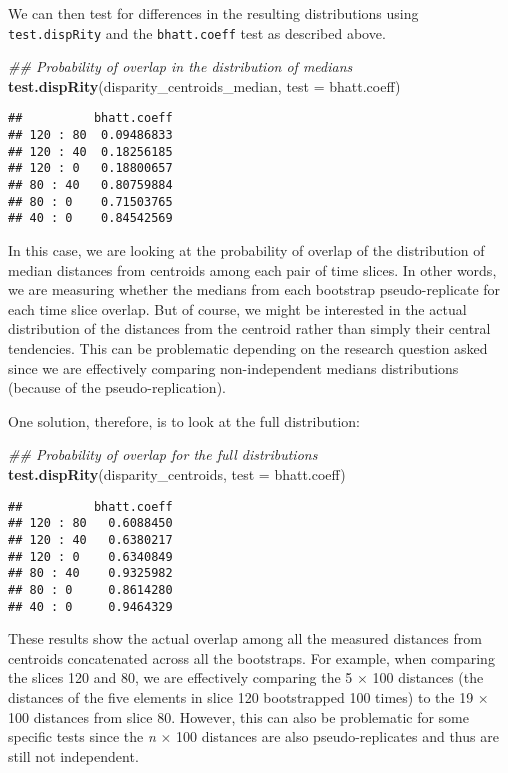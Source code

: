 \documentclass[
]{book}
\newenvironment{Shaded}{\begin{snugshade}}{\end{snugshade}}
\newcommand{\CommentTok}[1]{\textcolor[rgb]{0.56,0.35,0.01}{\textit{#1}}}
\newcommand{\DataTypeTok}[1]{\textcolor[rgb]{0.13,0.29,0.53}{#1}}
\newcommand{\KeywordTok}[1]{\textcolor[rgb]{0.13,0.29,0.53}{\textbf{#1}}}
\newcommand{\NormalTok}[1]{#1}
\begin{document}
We can then test for differences in the resulting distributions using \texttt{test.dispRity} and the \texttt{bhatt.coeff} test as described above.

\begin{Shaded}
\begin{Highlighting}[]
\CommentTok{\#\# Probability of overlap in the distribution of medians}
\KeywordTok{test.dispRity}\NormalTok{(disparity\_centroids\_median, }\DataTypeTok{test =}\NormalTok{ bhatt.coeff)}
\end{Highlighting}
\end{Shaded}

\begin{verbatim}
##          bhatt.coeff
## 120 : 80  0.09486833
## 120 : 40  0.18256185
## 120 : 0   0.18800657
## 80 : 40   0.80759884
## 80 : 0    0.71503765
## 40 : 0    0.84542569
\end{verbatim}

In this case, we are looking at the probability of overlap of the distribution of median distances from centroids among each pair of time slices.
In other words, we are measuring whether the medians from each bootstrap pseudo-replicate for each time slice overlap.
But of course, we might be interested in the actual distribution of the distances from the centroid rather than simply their central tendencies.
This can be problematic depending on the research question asked since we are effectively comparing non-independent medians distributions (because of the pseudo-replication).

One solution, therefore, is to look at the full distribution:

\begin{Shaded}
\begin{Highlighting}[]
\CommentTok{\#\# Probability of overlap for the full distributions}
\KeywordTok{test.dispRity}\NormalTok{(disparity\_centroids, }\DataTypeTok{test =}\NormalTok{ bhatt.coeff)}
\end{Highlighting}
\end{Shaded}

\begin{verbatim}
##          bhatt.coeff
## 120 : 80   0.6088450
## 120 : 40   0.6380217
## 120 : 0    0.6340849
## 80 : 40    0.9325982
## 80 : 0     0.8614280
## 40 : 0     0.9464329
\end{verbatim}

These results show the actual overlap among all the measured distances from centroids concatenated across all the bootstraps.
For example, when comparing the slices 120 and 80, we are effectively comparing the 5 \(\times\) 100 distances (the distances of the five elements in slice 120 bootstrapped 100 times) to the 19 \(\times\) 100 distances from slice 80.
However, this can also be problematic for some specific tests since the \emph{n} \(\times\) 100 distances are also pseudo-replicates and thus are still not independent.
\end{document}
